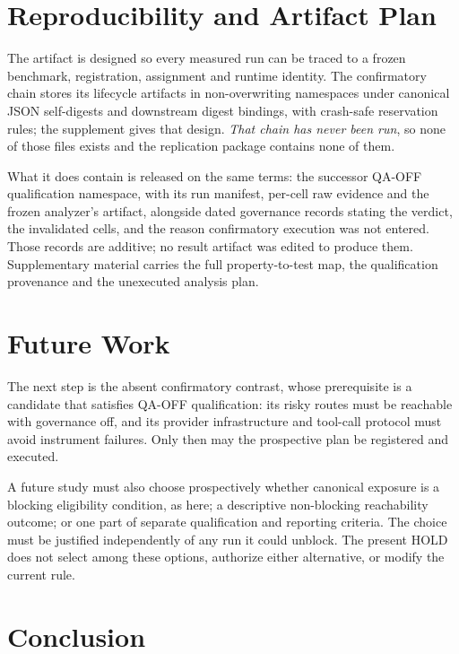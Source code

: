 \documentclass[acmsmall,screen,review,anonymous]{acmart}
\begin{document}
\section{Reproducibility and Artifact Plan}
\label{sec:repro}
\label{pg:repro}

The artifact is designed so every measured run can be traced to a frozen benchmark,
registration, assignment and runtime identity. The confirmatory chain stores its
lifecycle artifacts in non-overwriting namespaces under canonical JSON self-digests
and downstream digest bindings, with crash-safe reservation rules; the supplement
gives that design. \emph{That chain has never been run}, so none of those files
exists and the replication package contains none of them.

What it does contain is released on the same terms: the successor QA-OFF
qualification namespace, with its run manifest, per-cell raw evidence and the
frozen analyzer's artifact, alongside dated governance records stating the verdict,
the invalidated cells, and the reason confirmatory execution was not entered. Those
records are additive; no result artifact was edited to produce them. Supplementary
material carries the full property-to-test map, the qualification provenance and
the unexecuted analysis plan.


\section{Future Work}
\label{pg:future}

The next step is the absent confirmatory contrast, whose prerequisite is a candidate
that satisfies QA-OFF qualification: its risky routes must be reachable with
governance off, and its provider infrastructure and tool-call protocol must avoid
instrument failures. Only then may the prospective plan be registered and executed.

A future study must also choose prospectively whether canonical exposure is a
blocking eligibility condition, as here; a descriptive non-blocking reachability
outcome; or one part of separate qualification and reporting criteria. The choice
must be justified independently of any run it could unblock. The present HOLD does
not select among these options, authorize either alternative, or modify the current
rule.


\section{Conclusion}
\label{pg:conclusion}
\end{document}
